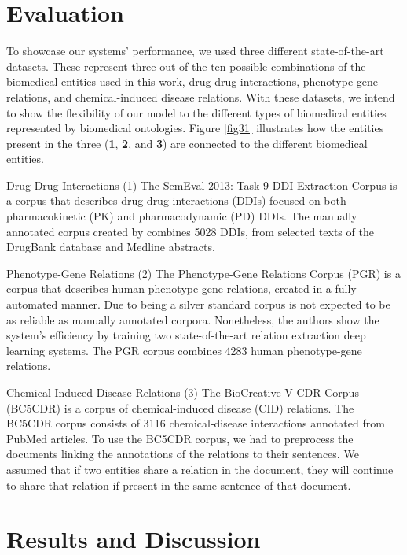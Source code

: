 \section{Evaluation}

To showcase our systems' performance, we used three different state-of-the-art datasets. These  represent three out of the ten possible combinations of the biomedical entities used in this work, drug-drug interactions, phenotype-gene relations, and chemical-induced disease relations. With these datasets, we intend to show the flexibility of our model to the different types of biomedical entities represented by biomedical ontologies. Figure \ref{fig31} illustrates how the entities present in the three  (\textbf{1}, \textbf{2}, and \textbf{3}) are connected to the different biomedical entities.

Drug-Drug Interactions (1) The SemEval 2013: Task 9 DDI Extraction Corpus \citep{herrero2013ddi} is a corpus that describes drug-drug interactions (DDIs) focused on both pharmacokinetic (PK) and pharmacodynamic (PD) DDIs. The manually annotated corpus created by \cite{herrero2013ddi} combines 5028 DDIs, from selected texts of the DrugBank database and  Medline abstracts. 

Phenotype-Gene Relations (2) The Phenotype-Gene Relations Corpus (PGR) \citep{sousa2019silver} is a corpus that describes human phenotype-gene relations, created in a fully automated manner. Due to being a silver standard corpus is not expected to be as reliable as manually annotated corpora. Nonetheless, the authors show the system's efficiency by training two state-of-the-art relation extraction deep learning systems. The PGR corpus combines 4283 human phenotype-gene relations.

Chemical-Induced Disease Relations (3) The BioCreative V CDR Corpus (BC5CDR) \citep{li2016biocreative} is a corpus of chemical-induced disease (CID) relations. The BC5CDR corpus consists of 3116 chemical-disease interactions annotated from PubMed articles. To use the BC5CDR corpus, we had to preprocess the documents linking the annotations of the relations to their sentences. We assumed that if two entities share a relation in the document, they will continue to share that relation if present in the same sentence of that document. 

\section{Results and Discussion}

